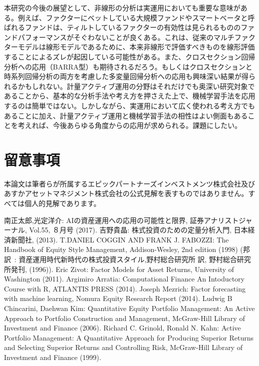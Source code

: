本研究の今後の展望として、非線形の分析は実運用においても重要な意味がある。例えば、ファクターにベットしている大規模ファンドやスマートベータと呼ばれるファンドは、ティルトしているファクターの有効性は見られるもののファンドパフォーマンスがそぐわないことが良くある。これは、従来のマルチファクターモデルは線形モデルであるために、本来非線形で評価すべきものを線形評価することによるズレが起因している可能性がある。また、クロスセクション回帰分析への応用（BARRA型）も期待されるだろう。もしくはクロスセクションと時系列回帰分析の両方を考慮した多変量回帰分析への応用も興味深い結果が得られるかもしれない。計量アクティブ運用の分野はそれだけでも奥深い研究対象であることから、基本的な分析手法や考え方を押さえた上で、機械学習手法を応用するのは簡単ではない。しかしながら、実運用において広く使われる考え方でもあることに加え、計量アクティブ運用と機械学習手法の相性はよい側面もあることを考えれば、今後あらゆる角度からの応用が求められる。課題にしたい。


\section{留意事項} %
本論文は筆者らが所属するエピックパートナーズインベストメンツ株式会社及びあすかアセットマネジメント株式会社の公式見解を表すものではありません。すべては個人的見解であります。


\begin{thebibliography}{99} %
\bibitem[南 17]{}
南正太郎,光定洋介: AIの資産運用への応用の可能性と限界, 証券アナリストジャーナル, Vol.55, ８月号  (2017).
\bibitem[吉野 03]{}
吉野貴晶: 株式投資のための定量分析入門, 日本経済新聞社, (2013).
\bibitem[T.DANIEL 95]{}
T.DANIEL COGGIN AND FRANK J. FABOZZI: The Handbook of Equity Style Management, Addison-Wesley, 2nd edition (1998)
  (邦訳~: 資産運用時代新時代の株式投資スタイル,野村総合研究所 訳, 野村総合研究所発刊, (1996)).
\bibitem[Eric 11]{}
Eric Zivot: Factor Models for Asset Returns, University of Washington (2011).
\bibitem[Argimiro 14]{}
Argimiro Arratia: Computational Finance An Intoductory Course with R, ATLANTIS PRESS (2014).
\bibitem[Joseph 14]{}
Joseph Mezrich: Factor forecasting with machine learning, Nomura Equity Research Report (2014).
\bibitem[Ludwig 06]{}
Ludwig B Chincarini, Daehwan Kim: Quantitative Equity Portfolio Management: An Active Approach to Portfolio Construction and Management, McGraw-Hill Library of Investment and Finance (2006).
\bibitem[Richard 99]{}
Richard C. Grinold, Ronald N. Kahn: Active Portfolio Management: A Quantitative Approach for Producing Superior Returns and Selecting Superior Returns and Controlling Risk, McGraw-Hill Library of Investment and Finance (1999).
\end{thebibliography}
